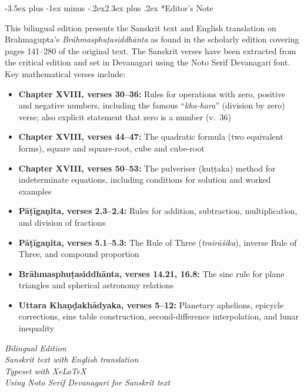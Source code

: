 \documentclass[11pt,a4paper]{article}
\makeatletter
\renewcommand{\section}{\@startsection {section}{1}{\z@}%
  {-3.5ex plus -1ex minus -.2ex}{2.3ex plus .2ex}%
  {\normalfont\Large\bfseries\color{sectioncolor}}}
\makeatother
\begin{document}
\section*{Editor's Note}

This bilingual edition presents the Sanskrit text and English translation on Brahmagupta's \textit{Brāhmasphuṭasiddhānta} as found in the scholarly edition covering pages 141--280 of the original text. The Sanskrit verses have been extracted from the critical edition and set in Devanagari using the Noto Serif Devanagari font. Key mathematical verses include:

\begin{itemize}
\item \textbf{Chapter XVIII, verses 30--36:} Rules for operations with zero, positive and negative numbers, including the famous ``\textit{kha-hara}'' (division by zero) verse; also explicit statement that zero is a number (v.\ 36)
\item \textbf{Chapter XVIII, verses 44--47:} The quadratic formula (two equivalent forms), square and square-root, cube and cube-root
\item \textbf{Chapter XVIII, verses 50--53:} The pulveriser (kuṭṭaka) method for indeterminate equations, including conditions for solution and worked examples
\item \textbf{Pāṭīgaṇita, verses 2.3--2.4:} Rules for addition, subtraction, multiplication, and division of fractions
\item \textbf{Pāṭīgaṇita, verses 5.1--5.3:} The Rule of Three (\textit{trairāśika}), inverse Rule of Three, and compound proportion
\item \textbf{Brāhmasphuṭasiddhānta, verses 14.21, 16.8:} The sine rule for plane triangles and spherical astronomy relations
\item \textbf{Uttara Khaṇḍakhādyaka, verses 5--12:} Planetary aphelions, epicycle corrections, sine table construction, second-difference interpolation, and lunar inequality
\end{itemize}

\vspace{1cm}
\begin{flushright}
\textit{Bilingual Edition}\\
\textit{Sanskrit text with English translation}\\
\textit{Typeset with XeLaTeX}\\
\textit{Using Noto Serif Devanagari for Sanskrit text}
\end{flushright}
\end{document}
